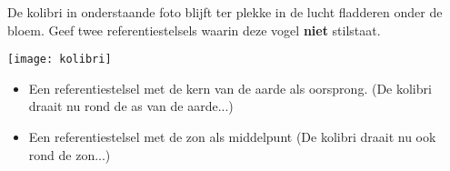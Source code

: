 \documentclass{ximera}
\begin{document}
\begin{exercise}
De kolibri in onderstaande foto blijft ter plekke in de lucht fladderen onder de bloem. Geef twee referentiestelsels waarin deze vogel \textbf{niet} stilstaat. 

\begin{center}
\begin{minipage}[t]{0.30\textwidth}
\begin{image}[\linewidth]
	\texttt{[image: kolibri]}
\end{image}
\end{minipage}
\end{center}


\begin{oplossing}\nl
\begin{itemize}
\item Een referentiestelsel met de kern van de aarde als oorsprong. (De kolibri draait nu rond de as van de aarde...)
\item Een referentiestelsel met de zon als middelpunt (De kolibri draait nu ook rond de zon...)
\end{itemize}

\end{oplossing}

\end{exercise}
\end{document}
